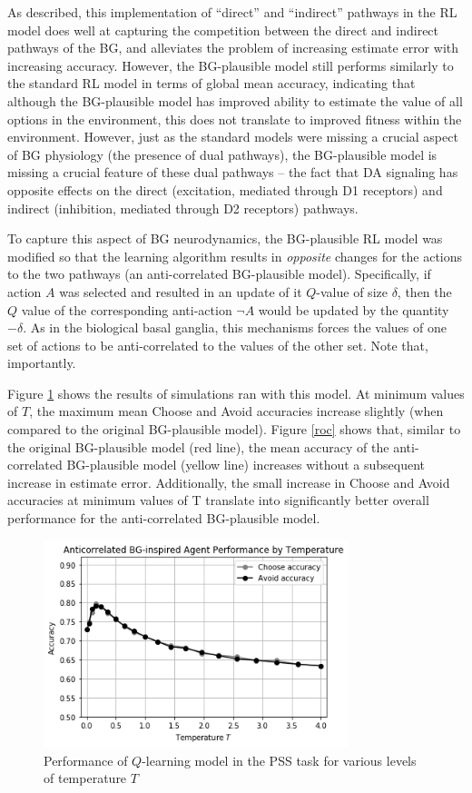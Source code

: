 \documentclass[10pt,letterpaper]{article}
\begin{document}
As described, this implementation of ``direct'' and ``indirect'' pathways in the RL model does well at capturing the competition between the direct and indirect pathways of the BG, and alleviates the problem of increasing estimate error with increasing accuracy. However, the BG-plausible model still performs similarly to the standard RL model in terms of global mean accuracy, indicating that although the BG-plausible model has improved ability to estimate the value of all options in the environment, this does not translate to improved fitness within the environment. However, just as the standard models were missing a crucial aspect of BG physiology (the presence of dual pathways), the BG-plausible model is missing a crucial feature of these dual pathways -- the fact that DA signaling has opposite effects on the direct (excitation, mediated through D1 receptors) and indirect (inhibition, mediated through D2 receptors) pathways. 

To capture this aspect of BG neurodynamics, the BG-plausible RL model was modified so that the learning algorithm results in \emph{opposite} changes for the actions to the two pathways (an anti-correlated BG-plausible model). Specifically, if action $A$ was selected and resulted in an update  of it $Q$-value of size $\delta$, then the $Q$ value of the corresponding anti-action $\neg A$ would be updated by the quantity $-\delta$. As in the biological basal ganglia, this mechanisms forces the values of one set of actions to be anti-correlated to the values of the other set. Note that, importantly.

Figure \ref{bg-anti-agent} shows the results of simulations ran with this model. At minimum values of $T$, the maximum mean Choose and Avoid accuracies increase slightly (when compared to the original BG-plausible model). Figure \ref{roc} shows that, similar to the original BG-plausible model (red line), the mean accuracy of the anti-correlated BG-plausible model (yellow line) increases without a subsequent increase in estimate error. Additionally, the small increase in Choose and Avoid accuracies at minimum values of T translate into significantly better overall performance for the anti-correlated BG-plausible model. 

\begin{figure}[ht]
	\begin{center}
		\includegraphics[width=3.5in]{bg-anti-agent-performance.png}
	\end{center}
	\caption{Performance of $Q$-learning model in the PSS task for various levels of temperature $T$} 
	\label{bg-anti-agent}
\end{figure}
\end{document}
